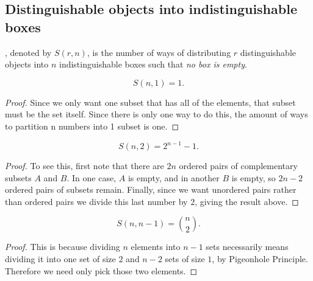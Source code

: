 \subsection{Distinguishable objects into indistinguishable boxes}

\begin{definition}
, denoted by $S(r,n)$, is the number of ways of distributing $r$ distinguishable objects into $n$ indistinguishable boxes such that \emph{no box is empty}.
\end{definition}

\begin{lemma}
\begin{equation}
S(n,1)=1.
\end{equation}
\end{lemma}

\begin{proof}
Since we only want one subset that has all of the elements, that subset must be the set itself. Since there is only one way to do this, the amount of ways to partition n numbers into 1 subset is one.
\end{proof}

\begin{lemma}
\begin{equation}
S(n,2)=2^{n-1}-1.
\end{equation}
\end{lemma}

\begin{proof}
To see this, first note that there are $2n$ ordered pairs of complementary subsets $A$ and $B$. In one case, $A$ is empty, and in another $B$ is empty, so $2n-2$ ordered pairs of subsets remain. Finally, since we want unordered pairs rather than ordered pairs we divide this last number by $2$, giving the result above.
\end{proof}

\begin{lemma}
\begin{equation}
S(n,n-1)=\binom{n}{2}.
\end{equation}
\end{lemma}

\begin{proof}
This is because dividing $n$ elements into $n-1$ sets necessarily means dividing it into one set of size $2$ and $n-2$ sets of size $1$, by Pigeonhole Principle. Therefore we need only pick those two elements.
\end{proof}

